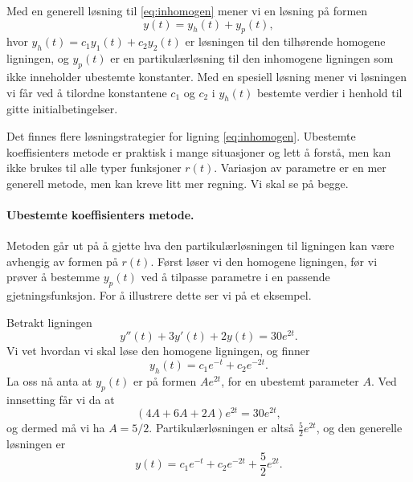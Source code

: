\documentclass{article}
\theoremstyle{definition}
\newenvironment{defn}
{\pushQED{\qed}\renewcommand{\qedsymbol}{$\triangle$}\defnx}
{\popQED\enddefnx}
\newenvironment{ex}
{\pushQED{\qed}\renewcommand{\qedsymbol}{$\triangle$}\exx}
{\popQED\endexx}
\theoremstyle{remark}
\begin{document}
\begin{multicols*}{2}
\begin{defn}
    Med en generell løsning til \eqref{eq:inhomogen} mener vi en løsning på formen
    \begin{equation*}
        y(t) = y_h(t) + y_p(t),    
    \end{equation*}
    hvor $y_h(t) = c_1 y_1(t) + c_2 y_2(t)$ er løsningen til den tilhørende homogene ligningen, og $y_p(t)$ er en partikulærløsning til den inhomogene ligningen som ikke inneholder ubestemte konstanter. Med en spesiell løsning mener vi løsningen vi får ved å tilordne konstantene $c_1$ og $c_2$ i $y_h(t)$ bestemte verdier i henhold til gitte initialbetingelser.
\end{defn}

Det finnes flere løsningstrategier for ligning \eqref{eq:inhomogen}. Ubestemte koeffisienters metode er praktisk i mange situasjoner og lett å forstå, men kan ikke brukes til alle typer funksjoner $r(t)$. Variasjon av parametre er en mer generell metode, men kan kreve litt mer regning. Vi skal se på begge.

\paragraph*{Ubestemte koeffisienters metode.} Metoden går ut på å gjette hva den partikulærløsningen til ligningen kan være avhengig av formen på $r(t)$. Først løser vi den homogene ligningen, før vi prøver å bestemme $y_p(t)$ ved å tilpasse parametre i en passende gjetningsfunksjon. For å illustrere dette ser vi på et eksempel.

\begin{ex}
  Betrakt ligningen
  \begin{equation*}
    y''(t) + 3 y'(t) + 2 y(t) = 30 e^{2 t}.
  \end{equation*}
  Vi vet hvordan vi skal løse den homogene ligningen, og finner
  \begin{equation*}
    y_h(t) = c_1 e^{-t} + c_2 e^{-2 t}.
  \end{equation*}
  La oss nå anta at $y_p(t)$ er på formen $A e^{2t}$, for en ubestemt parameter $A$. Ved innsetting får vi da at
  \begin{equation*}
    (4 A + 6 A + 2 A) e^{2 t} = 30 e^{2 t},
  \end{equation*}
  og dermed må vi ha $A = 5/2$. Partikulærløsningen er altså $\frac{5}{2} e^{2 t}$, og den generelle løsningen er
  \begin{equation*}
    y(t) = c_1 e^{-t} + c_2 e^{-2 t} + \frac{5}{2} e^{2 t}.
  \end{equation*}
\end{ex}


\end{multicols*}
\end{document}

